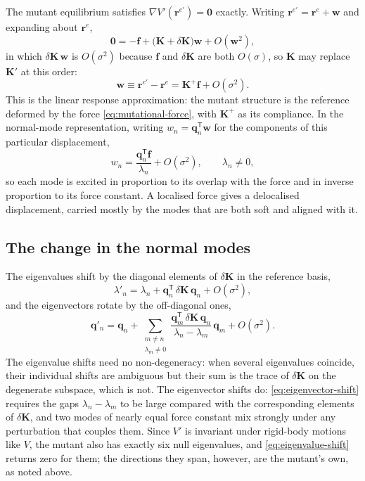 \documentclass[11pt]{article}
\newcommand{\rr}{\mathbf{r}}
\newcommand{\KK}{\mathbf{K}}
\newcommand{\re}{\rr^{e}}
\newcommand{\rem}{\rr^{e\prime}}   %
\begin{document}
The mutant equilibrium satisfies $\nabla V'(\rem) = \mathbf{0}$ exactly.
Writing $\rem = \re + \mathbf{w}$ and expanding about $\re$,
\begin{equation}
\mathbf{0} = -\mathbf{f} + \big(\KK + \delta\KK\big)\mathbf{w} + O(\mathbf{w}^{2}),
\end{equation}
in which $\delta\KK\,\mathbf{w}$ is $O(\sigma^{2})$ because $\mathbf{f}$ and $\delta\KK$ are both $O(\sigma)$, so $\KK$ may replace $\KK'$ at this order:
\begin{equation}
\boxed{
\mathbf{w} \equiv \rem - \re = \KK^{+}\mathbf{f} + O(\sigma^{2}) .
}
\label{eq:first-order-displacement}
\end{equation}
This is the linear response approximation: the mutant structure is the reference deformed by the force \eqref{eq:mutational-force}, with $\KK^{+}$ as its compliance.
In the normal-mode representation, writing $w_n = \mathbf{q}_n^{\mathsf T}\mathbf{w}$ for the components of this particular displacement,
\begin{equation}
\boxed{
w_n = \frac{\mathbf{q}_n^{\mathsf T}\mathbf{f}}{\lambda_n} + O(\sigma^{2}),
\qquad \lambda_n \ne 0,
}
\label{eq:first-order-displacement-modal}
\end{equation}
so each mode is excited in proportion to its overlap with the force and in inverse proportion to its force constant.
A localised force gives a delocalised displacement, carried mostly by the modes that are both soft and aligned with it.

\subsection*{The change in the normal modes}

The eigenvalues shift by the diagonal elements of $\delta\KK$ in the reference basis,
\begin{equation}
\boxed{
\lambda'_n = \lambda_n + \mathbf{q}_n^{\mathsf T}\, \delta\KK\, \mathbf{q}_n + O(\sigma^{2}),
}
\label{eq:eigenvalue-shift}
\end{equation}
and the eigenvectors rotate by the off-diagonal ones,
\begin{equation}
\boxed{
\mathbf{q}'_n = \mathbf{q}_n + \sum_{\substack{m \ne n \\ \lambda_m \ne 0}}
\frac{\mathbf{q}_m^{\mathsf T}\, \delta\KK\, \mathbf{q}_n}{\lambda_n - \lambda_m}\, \mathbf{q}_m
+ O(\sigma^{2}) .
}
\label{eq:eigenvector-shift}
\end{equation}
The eigenvalue shifts need no non-degeneracy: when several eigenvalues coincide, their individual shifts are ambiguous but their sum is the trace of $\delta\KK$ on the degenerate subspace, which is not.
The eigenvector shifts do: \eqref{eq:eigenvector-shift} requires the gaps $\lambda_n - \lambda_m$ to be large compared with the corresponding elements of $\delta\KK$, and two modes of nearly equal force constant mix strongly under any perturbation that couples them.
Since $V'$ is invariant under rigid-body motions like $V$, the mutant also has exactly six null eigenvalues, and \eqref{eq:eigenvalue-shift} returns zero for them; the directions they span, however, are the mutant's own, as noted above.
\end{document}

